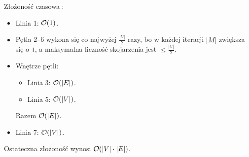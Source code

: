 Złożoność czasowa \textnormal{}:
\begin{itemize}[nosep]
	\item Linia 1: $\mathcal{O}(1)$.
	\item Pętla 2--6 wykona się co najwyżej $\frac{|V|}{2}$ razy, bo w każdej iteracji $|M|$ zwiększa się o $1$, a maksymalna liczność skojarzenia jest $\le \frac{|V|}{2}$.
	\item Wnętrze pętli:
	      \begin{itemize}[nosep]
		      \item Linia 3: $\mathcal{O}(|E|)$.
		      \item Linia 5: $\mathcal{O}(|V|)$.
	      \end{itemize}
	      Razem $\mathcal{O}(|E|)$.
	\item Linia 7: $\mathcal{O}(|V|)$.
\end{itemize}
Ostateczna złożoność \textnormal{} wynosi $\mathcal{O}(|V| \cdot |E|)$.



